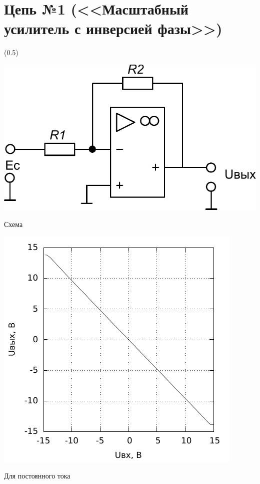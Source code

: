 \section{Цепь №1 (<<Масштабный усилитель с инверсией фазы>>)}

\sidefig(0.5\textwidth){
\includegraphics[scale=0.6]{Circ1.pdf}
\caption{Схема}
\includegraphics[scale=1.2]{1.pdf}
\caption{Для постоянного тока}}
